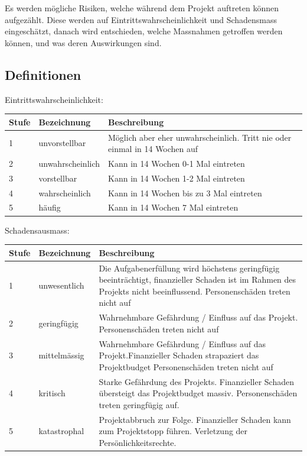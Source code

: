 \documentclass[a4paper]{scrreprt}
\begin{document}
Es werden mögliche Risiken, welche während dem Projekt auftreten können aufgezählt. Diese werden auf Eintrittswahrscheinlichkeit und Schadensmass eingeschätzt, danach wird entschieden, welche Massnahmen getroffen werden können, und was deren Auswirkungen sind.

\subsection{Definitionen}
\label{sssec:Def}
\vspace{1em}
\noindent
Eintrittswahrscheinlichkeit:

\vspace{1em}
\noindent
\begin{tabularx}{\textwidth}{|l|l|X|}
	\hline
	\textbf{Stufe} & \textbf{Bezeichnung} & \textbf{Beschreibung} \\
	\hline
	1 & unvorstellbar & Möglich aber eher unwahrscheinlich. Tritt nie oder einmal in 14 Wochen auf \\
	\hline
	2 & unwahrscheinlich & Kann in 14 Wochen 0-1 Mal eintreten\\
	\hline
	3 & vorstellbar & Kann in 14 Wochen 1-2 Mal eintreten \\
	\hline
	4 & wahrscheinlich & Kann in 14 Wochen bis zu 3 Mal eintreten \\
	\hline
	5 & häufig & Kann in 14 Wochen 7 Mal eintreten\\
	\hline
\end{tabularx}

\vspace{1em}
\noindent
Schadensausmass:

\vspace{1em}
\noindent
\begin{tabularx}{\textwidth}{|l|l|X|}
	\hline
	\textbf{Stufe} & \textbf{Bezeichnung} & \textbf{Beschreibung} \\
	\hline
	1 & unwesentlich & Die Aufgabenerfüllung wird höchstens geringfügig beeinträchtigt, finanzieller Schaden ist im Rahmen des Projekts nicht beeinflussend. Personenschäden treten nicht auf \\
	\hline
	2 & geringfügig & Wahrnehmbare Gefährdung / Einfluss auf das Projekt. Personenschäden treten nicht auf \\
	\hline
	3 & mittelmässig & Wahrnehmbare Gefährdung / Einfluss auf das Projekt.Finanzieller Schaden strapaziert das Projektbudget
	Personenschäden treten nicht auf \\
	\hline
	4 & kritisch & Starke Gefährdung des Projekts. Finanzieller Schaden übersteigt das Projektbudget massiv. Personenschäden treten geringfügig auf.\\
	\hline
	5 & katastrophal & Projektabbruch zur Folge. Finanzieller Schaden kann zum Projektstopp führen. Verletzung der Persönlichkeitsrechte.
	\\
	\hline
\end{tabularx}
\end{document}
